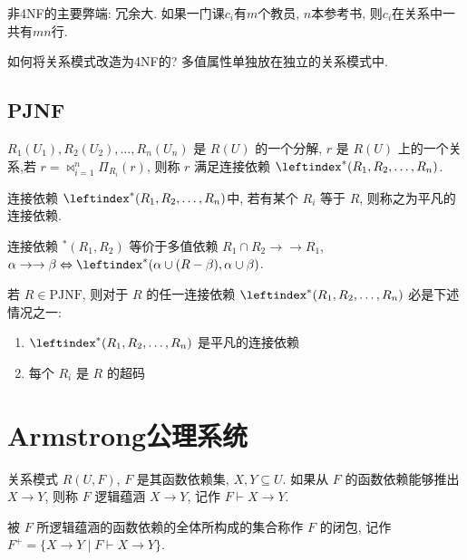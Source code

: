 非4NF的主要弊端: 冗余大. 如果一门课$c_i$有$m$个教员, $n$本参考书, 则$c_i$在关系中一共有$mn$行.

如何将关系模式改造为4NF的? 多值属性单独放在独立的关系模式中.

\subsection{PJNF}

\begin{definition}[连接依赖]
  $R_1(U_1), R_2(U_2), \dots, R_n(U_n)$ 是 $R(U)$ 的一个分解,
  $r$ 是 $R(U)$ 上的一个关系,若 $r = \bowtie_{i=1}^{n} \Pi_{R_i}(r)$,
  则称 $r$ 满足连接依赖 $\leftindex^*(R_1, R_2, \dots, R_n)$.
\end{definition}


连接依赖 $\leftindex^{*}(R_1, R_2, \ldots, R_n)$中, 若有某个 $R_i$ 等于 $R$, 则称之为平凡的连接依赖.

连接依赖 $^{*}(R_1, R_2)$ 等价于多值依赖 $R_1 \cap R_2 \to\to R_1$,
$\alpha \to\to \beta \Leftrightarrow \leftindex^{*}(\alpha \cup (R - \beta), \alpha \cup \beta)$.

\begin{definition}[PJNF]
  若 $R \in \text{PJNF}$, 则对于 $R$ 的任一连接依赖 $\leftindex^{*}(R_1, R_2, \dots, R_n)$ 必是下述情况之一:
  \begin{enumerate}
      \item $\leftindex^{*}(R_1, R_2, \dots, R_n)$ 是平凡的连接依赖
      \item 每个 $R_i$ 是 $R$ 的超码
  \end{enumerate}
\end{definition}

\section{Armstrong公理系统}

\begin{definition}[逻辑蕴含]
  关系模式 $R(U, F)$, $F$ 是其函数依赖集, $X, Y \subseteq U$.
  如果从 $F$ 的函数依赖能够推出 $X \rightarrow Y$,
  则称 $F$ 逻辑蕴涵 $X \rightarrow Y$, 记作 $F \vdash X \rightarrow Y$.
\end{definition}

\begin{definition}[闭包]
  被 $F$ 所逻辑蕴涵的函数依赖的全体所构成的集合称作 $F$ 的闭包, 
  记作 $F^+ = \{X \rightarrow Y \mid F \vdash X \rightarrow Y\}$.
\end{definition}

